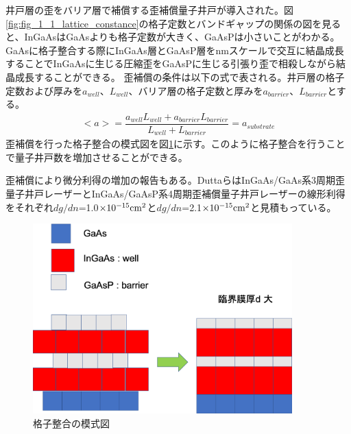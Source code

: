 井戸層の歪をバリア層で補償する歪補償量子井戸が導入された。図\ref{fig:fig_1_1_lattice_constance}の格子定数とバンドギャップの関係の図を見ると、InGaAsはGaAsよりも格子定数が大きく、GaAsPは小さいことがわかる。GaAsに格子整合する際に\rm{InGaAs}層とGaAsP層をnmスケールで交互に結晶成長することで\rm{InGaAs}に生じる圧縮歪をGaAsPに生じる引張り歪で相殺しながら結晶成長することができる。
歪補償の条件は以下の式で表される。井戸層の格子定数および厚みを$a_{well}$、$L_{well}$、バリア層の格子定数と厚みを$a_{barrier}$、$L_{barrier}$とする。
\begin{eqnarray}
<a>=\dfrac{a_{well}L_{well}+a_{barrier}L_{barrier}}{L_{well}+L_{barrier}}=a_{substrate}
\label{eq:conpensate}
\end{eqnarray}
歪補償を行った格子整合の模式図を図\ref{fig:fig_1_1_lattice_strain_comp}に示す。このように格子整合を行うことで量子井戸数を増加させることができる。


歪補償により微分利得の増加の報告もある\cite{ref_Dutta}。DuttaらはInGaAs/GaAs系3周期歪量子井戸レーザーとInGaAs/GaAsP系4周期歪補償量子井戸レーザーの線形利得をそれぞれ$dg/dn$=1.0$\times 10^{-15}\rm{ cm^{2}}$と$dg/dn$=2.1$\times 10^{-15}\rm{ cm^{2}}$と見積もっている。

\begin{figure}[h]
	\centering
	\includegraphics[width=10cm]{figure/fig_1_1_lattice_strain.png}
	\caption{格子整合の模式図}
	\label{fig:fig_1_1_lattice_strain_comp}
\end{figure}

